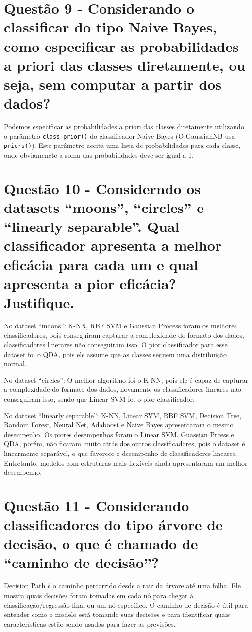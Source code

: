 \documentclass[12pt, a4paper]{article}
\begin{document}
\section*{Questão 9 - Considerando o classificar do tipo Naive Bayes, como especificar as probabilidades a priori
das classes diretamente, ou seja, sem computar a partir dos dados?}

Podemos especificar as probabilidades a priori das classes diretamente utilizando o parâmetro \texttt{class\_prior()} do classificador Naive Bayes (O GaussianNB usa \texttt{priors()}). 
Este parâmetro aceita uma lista de probabilidades para cada classe, onde obviamenete a soma das probabilidades deve ser igual a 1. 
 

\section*{  
    Questão 10 - Considerndo os datasets “moons”, “circles” e “linearly separable”. Qual classificador apresenta a melhor eficácia para cada um e qual apresenta a pior eficácia? Justifique.
}
No dataset “moons”: K-NN, RBF SVM e Gaussian Process foram os melhores classificadores, pois conseguiram capturar a complexidade do formato dos dados, classificadores linerares não conseguiram isso.
O pior classificador para esse dataset foi o QDA, pois ele assume que as classes seguem uma distribuição normal.

No dataset “circles”: O melhor algoritmo foi o K-NN, pois ele é capaz de capturar a complexidade do formato dos dados, novamente os classificadores lineares não conseguiram isso, sendo que Linear SVM foi o pior classificador.

No dataset “linearly separable”: K-NN, Linear SVM, RBF SVM, Decision Tree, Random Forest, Neural Net, Adaboost e Naive Bayes apresentaram o mesmo desempenho. 
Os piores desempenhos foram o Linear SVM, Guassian Prcess e QDA, porém, não ficaram muito atrás dos outros classificadores, pois o dataset é linearmente separável, o que favorece o 
desempenho de classificadores lineares. Entretanto, modelos com estruturas mais flexíveis ainda apresentaram um melhor desempenho.


\section*{Questão 11 - Considerando classificadores do tipo árvore de decisão, o que é chamado de “caminho de
decisão”?}

Decision Path é o caminho percorrido desde a raiz da árvore até uma folha. Ele mostra quais decisões foram tomadas em cada nó para chegar à classificação/regressão final ou um nó específico. O caminho de decisão é útil para entender como o modelo está tomando suas decisões e para identificar quais características estão sendo usadas para fazer as previsões.

\nocite{bishop2006prml,sklearn-doc}

\end{document}
